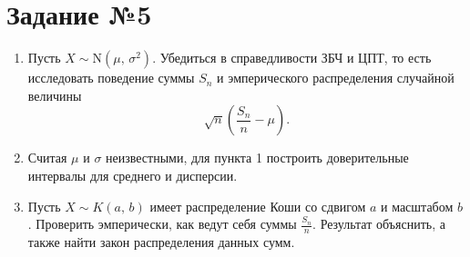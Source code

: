 \section{Задание №5}

\begin{enumerate}
        \item Пусть $X \sim \mbox{N}(\mu,\,\sigma^2)$. Убедиться в справедливости ЗБЧ и ЦПТ, то есть исследовать поведение суммы $S_n$ и эмперического распределения случайной величины
$$
        \sqrt{n}
        \left(
                \frac{S_n}{n} - \mu
        \right).
$$
        \item Считая $\mu$ и $\sigma$ неизвестными, для пункта 1 построить доверительные интервалы для среднего и дисперсии.
        \item Пусть $X \sim K(a,\,b)$ имеет распределение Коши со сдвигом $a$ и масштабом $b$. Проверить эмперически, как ведут себя суммы $\frac{S_n}{n}$. Результат объяснить, а также найти закон распределения данных сумм.
\end{enumerate}


